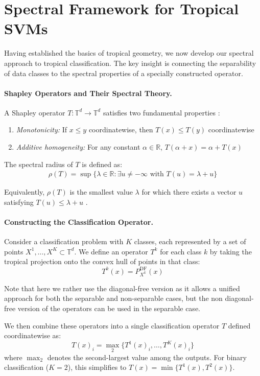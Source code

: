 \documentclass{article}
\newcommand{\R}{\mathbb{R}}
\newcommand{\trop}{\mathbb{T}}
\begin{document}
\section{Spectral Framework for Tropical SVMs}\label{sec:spectral}

Having established the basics of tropical geometry, we now develop our spectral approach to tropical classification. The key insight is connecting the separability of data classes to the spectral properties of a specially constructed operator.

\paragraph{Shapley Operators and Their Spectral Theory.}
A Shapley operator $T: \trop^d \to \trop^d$ satisfies two fundamental properties \cite{kolokoltsov1992}:
\begin{enumerate}
    \item \textit{Monotonicity:} If $x \leq y$ coordinatewise, then $T(x) \leq T(y)$ coordinatewise
    \item \textit{Additive homogeneity:} For any constant $\alpha \in \R$, $T(\alpha + x) = \alpha + T(x)$
\end{enumerate}

The spectral radius of $T$ is defined as:
\begin{align}
\rho(T) = \sup\{\lambda \in \R : \exists u \neq -\infty \text{ with } T(u) = \lambda + u\}
\end{align}

Equivalently, $\rho(T)$ is the smallest value $\lambda$ for which there exists a vector $u$ satisfying $T(u) \leq \lambda + u$ \cite{nussbaum1986}.

\paragraph{Constructing the Classification Operator.}
Consider a classification problem with $K$ classes, each represented by a set of points $X^1,\dots,X^K \subset \trop^d$. We define an operator $T^k$ for each class $k$ by taking the tropical projection onto the convex hull of points in that class:
\[
T^k(x) = P_{X^k}^{\text{DF}}(x)
\]

Note that here we rather use the diagonal-free version as it allows a unified approach for both the separable and non-separable cases, but the non diagonal-free version of the operators can be used in the separable case.

We then combine these operators into a single classification operator $T$ defined coordinatewise as:
\[
T(x)_i = \operatorname{\max}_2\{T^1(x)_i, \dots, T^K(x)_i\}
\]
where $\operatorname{\max}_2$ denotes the second-largest value among the outputs. For binary classification ($K=2$), this simplifies to $T(x)=\min\{T^1(x), T^2(x)\}$.
\end{document}
